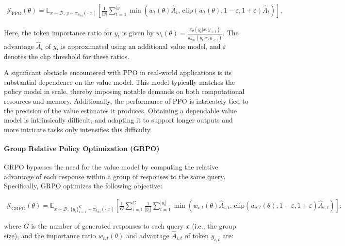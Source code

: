 \begin{align}
\mathcal{J}_\text{PPO}(\theta) = \mathbb{E}_{ x \sim \mathcal{D},\, y \sim \pi_{\theta_\text{old}}( \cdot | x) }
\left[ \frac{1}{|y|} \sum_{t=1}^{|y|} 
\min \left( w_{t}(\theta) \widehat{A}_{t},  \, \mathrm{clip} \left( w_{t}(\theta), 1 - {\varepsilon}, 1 + {\varepsilon}\right) \widehat{A}_{t} \right)
\right],
\end{align}

Here, the token importance ratio for $y_t$ is given by $
w_{t}(\theta) = \frac{ \pi_{\theta} (y_{t} | x, y_{<t}) }{ \pi_{\theta_\text{old}} (y_{t} | x,y_{<t})} $. The advantage $\widehat{A}_{t}$ of $y_t$ is approximated using an additional value model, and $\varepsilon$ denotes the clip threshold for these ratios.

A significant obstacle encountered with PPO in real-world applications is its substantial dependence on the value model. This model typically matches the policy model in scale, thereby imposing notable demands on both computational resources and memory. Additionally, the performance of PPO is intricately tied to the precision of the value estimates it produces. Obtaining a dependable value model is intrinsically difficult, and adapting it to support longer outputs and more intricate tasks only intensifies this difficulty.

\paragraph{Group Relative Policy Optimization (GRPO)} GRPO \citep{grpo} bypasses the need for the value model by computing the relative advantage of each response within a group of responses to the same query. Specifically, GRPO optimizes the following objective:

\begin{align}
\label{equ:grpo}
\mathcal{J}_\text{GRPO}(\theta) = \mathbb{E}_{ x \sim \mathcal{D},\, \{y_i\}_{i=1}^G \sim \pi_{\theta_\text{old}}( \cdot | x) }
\left[ \frac{1}{G} \sum_{i=1}^{G} \frac{1}{|y_i|} \sum_{t=1}^{|y_i|} 
\min \left( w_{i,t}(\theta) \widehat{A}_{i,t},  \, \mathrm{clip} \left( w_{i,t}(\theta), 1 - {\varepsilon}, 1 + {\varepsilon}\right) \widehat{A}_{i,t} \right)
\right],
\end{align}

where $G$ is the number of generated responses to each query $x$ (i.e., the group size), and the importance ratio $w_{i,t}(\theta)$ and advantage $\widehat{A}_{i,t}$ of token $y_{i,t}$ are:

